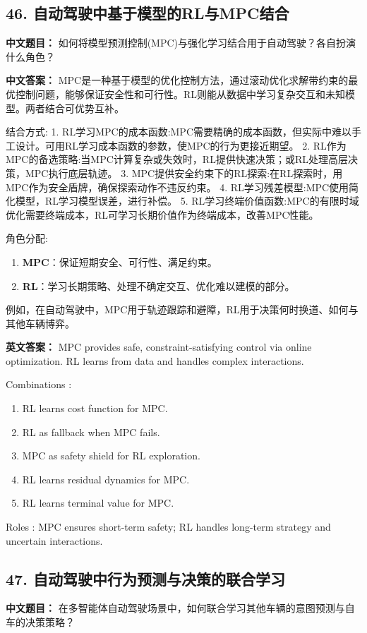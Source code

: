 \documentclass[10pt,a4paper]{ctexart}
\begin{document}
\subsection*{46. 自动驾驶中基于模型的RL与MPC结合}
\textbf{中文题目：} 如何将模型预测控制(MPC)与强化学习结合用于自动驾驶？各自扮演什么角色？

\textbf{中文答案：}  
MPC是一种基于模型的优化控制方法，通过滚动优化求解带约束的最优控制问题，能够保证安全性和可行性。RL则能从数据中学习复杂交互和未知模型。两者结合可优势互补。

 结合方式:
1.  RL学习MPC的成本函数:MPC需要精确的成本函数，但实际中难以手工设计。可用RL学习成本函数的参数，使MPC的行为更接近期望。
2.  RL作为MPC的备选策略:当MPC计算复杂或失效时，RL提供快速决策；或RL处理高层决策，MPC执行底层轨迹。
3.  MPC提供安全约束下的RL探索:在RL探索时，用MPC作为安全盾牌，确保探索动作不违反约束。
4.  RL学习残差模型:MPC使用简化模型，RL学习模型误差，进行补偿。
5.  RL学习终端价值函数:MPC的有限时域优化需要终端成本，RL可学习长期价值作为终端成本，改善MPC性能。

 角色分配:
\begin{enumerate}
    \item \textbf{MPC}：保证短期安全、可行性、满足约束。
    \item \textbf{RL}：学习长期策略、处理不确定交互、优化难以建模的部分。
\end{enumerate}

例如，在自动驾驶中，MPC用于轨迹跟踪和避障，RL用于决策何时换道、如何与其他车辆博弈。

\textbf{英文答案：}  
MPC provides safe, constraint-satisfying control via online optimization. RL learns from data and handles complex interactions.

 Combinations :
\begin{enumerate}
    \item RL learns cost function for MPC.
    \item RL as fallback when MPC fails.
    \item MPC as safety shield for RL exploration.
    \item RL learns residual dynamics for MPC.
    \item RL learns terminal value for MPC.
\end{enumerate}

 Roles : MPC ensures short-term safety; RL handles long-term strategy and uncertain interactions.

\subsection*{47. 自动驾驶中行为预测与决策的联合学习}
\textbf{中文题目：} 在多智能体自动驾驶场景中，如何联合学习其他车辆的意图预测与自车的决策策略？
\end{document}
